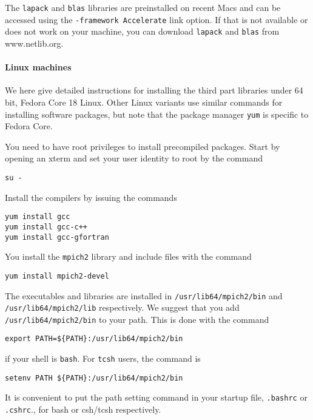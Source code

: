 \documentclass[11pt]{article}
\begin{document}
The \verb+lapack+ and \verb+blas+ libraries are preinstalled on recent Macs and can be accessed
using the \verb+-framework Accelerate+ link option. If that is not available or does not work on your
machine, you can download \verb+lapack+ and \verb+blas+ from www.netlib.org.

\paragraph{Linux machines}
We here give detailed instructions for installing the third part libraries under 64 bit, Fedora Core
18 Linux. Other Linux variants use similar commands for installing software packages, but note that 
the package manager \verb+yum+ is specific to Fedora Core.

You need to have root privileges to install precompiled packages. Start by opening an xterm and
set your user identity to root by the command
\begin{verbatim}
su -
\end{verbatim}
Install the compilers by issuing the commands
\begin{verbatim}
yum install gcc
yum install gcc-c++
yum install gcc-gfortran
\end{verbatim}
You install the \verb+mpich2+ library and include files with the command
\begin{verbatim}
yum install mpich2-devel
\end{verbatim}
The executables and libraries are installed in \verb+/usr/lib64/mpich2/bin+ and 
\verb+/usr/lib64/mpich2/lib+ respectively. We suggest that you add \verb+/usr/lib64/mpich2/bin+ to 
your path. This is done with the command
\begin{verbatim}
export PATH=${PATH}:/usr/lib64/mpich2/bin
\end{verbatim}
if your shell is \verb+bash+. For \verb+tcsh+ users, the command is
\begin{verbatim}
setenv PATH ${PATH}:/usr/lib64/mpich2/bin
\end{verbatim}
It is convenient to put the path setting command in
your startup file, \verb+.bashrc+ or \verb+.cshrc+., for bash or csh/tcsh respectively.
\end{document}
